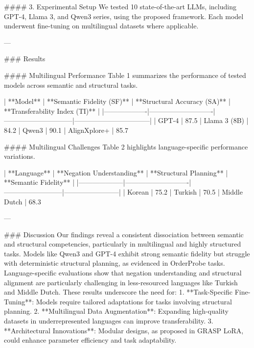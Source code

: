 #### 3. Experimental Setup
We tested 10 state-of-the-art LLMs, including GPT-4, Llama 3, and Qwen3 series, using the proposed framework. Each model underwent fine-tuning on multilingual datasets where applicable.

---

### Results

#### Multilingual Performance
Table 1 summarizes the performance of tested models across semantic and structural tasks.

| **Model**        | **Semantic Fidelity (SF)** | **Structural Accuracy (SA)** | **Transferability Index (TI)** |
|-------------------|----------------------------|------------------------------|---------------------------------|
| GPT-4            | 87.5%
| Llama 3 (8B)     | 84.2%
| Qwen3            | 90.1%
| AlignXplore+     | 85.7%

#### Multilingual Challenges
Table 2 highlights language-specific performance variations.

| **Language**      | **Negation Understanding** | **Structural Planning** | **Semantic Fidelity** |
|--------------------|----------------------------|--------------------------|------------------------|
| Korean            | 75.2%
| Turkish           | 70.5%
| Middle Dutch      | 68.3%

---

### Discussion
Our findings reveal a consistent dissociation between semantic and structural competencies, particularly in multilingual and highly structured tasks. Models like Qwen3 and GPT-4 exhibit strong semantic fidelity but struggle with deterministic structural planning, as evidenced in OrderProbe tasks. Language-specific evaluations show that negation understanding and structural alignment are particularly challenging in less-resourced languages like Turkish and Middle Dutch. These results underscore the need for:
1. **Task-Specific Fine-Tuning**: Models require tailored adaptations for tasks involving structural planning.
2. **Multilingual Data Augmentation**: Expanding high-quality datasets in underrepresented languages can improve transferability.
3. **Architectural Innovations**: Modular designs, as proposed in GRASP LoRA, could enhance parameter efficiency and task adaptability.

